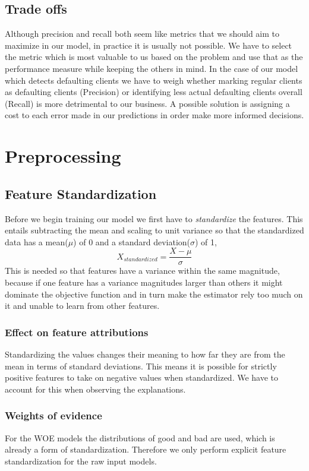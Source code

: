 \subsection{Trade offs}
Although precision and recall both seem like metrics that we should aim to maximize in our model, in practice it is usually not possible. We have to select the metric which is most valuable to us based on the problem and use that as the performance measure while keeping the others in mind. In the case of our model which detects defaulting clients we have to weigh whether marking regular clients as defaulting clients (Precision) or identifying less actual defaulting clients overall (Recall) is more detrimental to our business. A possible solution is assigning a cost to each error made in our predictions in order make more informed decisions.
\section{Preprocessing}
\subsection{Feature Standardization}

Before we begin training our model we first have to \emph{standardize} the features. This entails subtracting the mean and scaling to unit variance so that the standardized data has a mean($\mu$) of 0 and a standard deviation($\sigma$) of 1,
\begin{equation}
    X_{standardized} = \frac{X-\mu}{\sigma}
\end{equation}
This is needed so that features have a variance within the same magnitude, because if one feature has a variance magnitudes larger than others it might dominate the objective function and in turn make the estimator rely too much on it and unable to learn from other features. 
\subsubsection{Effect on feature attributions} Standardizing the values changes their meaning to how far they are from the mean in terms of standard deviations. This means it is possible for strictly positive features to take on negative values when standardized. We have to account for this when observing the explanations.
\subsubsection{Weights of evidence}
For the WOE models the distributions of good and bad are used, which is already a form of standardization. Therefore we only perform explicit feature standardization for the raw input models.
